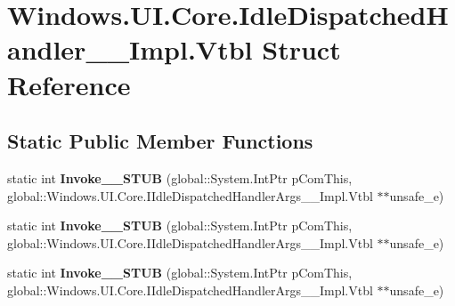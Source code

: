 \hypertarget{struct_windows_1_1_u_i_1_1_core_1_1_idle_dispatched_handler_____impl_1_1_vtbl}{}\section{Windows.\+U\+I.\+Core.\+Idle\+Dispatched\+Handler\+\_\+\+\_\+\+Impl.\+Vtbl Struct Reference}
\label{struct_windows_1_1_u_i_1_1_core_1_1_idle_dispatched_handler_____impl_1_1_vtbl}
\subsection*{Static Public Member Functions}
\begin{DoxyCompactItemize}
\item 
\mbox{\label{struct_windows_1_1_u_i_1_1_core_1_1_idle_dispatched_handler_____impl_1_1_vtbl_ab05667ff1acd4eafa890c08e24b46405}} 
static int {\bfseries Invoke\+\_\+\+\_\+\+S\+T\+UB} (global\+::\+System.\+Int\+Ptr p\+Com\+This, global\+::\+Windows.\+U\+I.\+Core.\+I\+Idle\+Dispatched\+Handler\+Args\+\_\+\+\_\+\+Impl.\+Vtbl $\ast$$\ast$unsafe\+\_\+e)
\item 
\mbox{\label{struct_windows_1_1_u_i_1_1_core_1_1_idle_dispatched_handler_____impl_1_1_vtbl_ab05667ff1acd4eafa890c08e24b46405}} 
static int {\bfseries Invoke\+\_\+\+\_\+\+S\+T\+UB} (global\+::\+System.\+Int\+Ptr p\+Com\+This, global\+::\+Windows.\+U\+I.\+Core.\+I\+Idle\+Dispatched\+Handler\+Args\+\_\+\+\_\+\+Impl.\+Vtbl $\ast$$\ast$unsafe\+\_\+e)
\item 
\mbox{\label{struct_windows_1_1_u_i_1_1_core_1_1_idle_dispatched_handler_____impl_1_1_vtbl_ab05667ff1acd4eafa890c08e24b46405}} 
static int {\bfseries Invoke\+\_\+\+\_\+\+S\+T\+UB} (global\+::\+System.\+Int\+Ptr p\+Com\+This, global\+::\+Windows.\+U\+I.\+Core.\+I\+Idle\+Dispatched\+Handler\+Args\+\_\+\+\_\+\+Impl.\+Vtbl $\ast$$\ast$unsafe\+\_\+e)
\item 
\mbox{\label{struct_windows_1_1_u_i_1_1_core_1_1_idle_dispatched_handler_____impl_1_1_vtbl_ab05667ff1acd4eafa890c08e24b46405}} 
$$
\end{DoxyCompactItemize}
